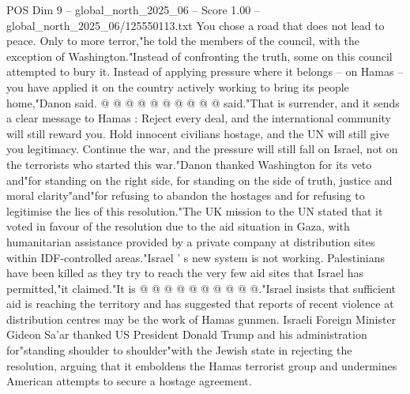\begin{textsample}{POS Dim 9 – global\_north\_2025\_06 – Score 1.00 – global\_north\_2025\_06/125550113.txt}
You chose a road that does not lead to peace.
Only to more terror,"he told the members of the council, with the exception of Washington."Instead of confronting the truth, some on this council attempted to bury it.
Instead of applying pressure where it belongs -- on Hamas -- you have applied it on the country actively working to bring its people home,"Danon said. @ @ @ @ @ @ @ @ @ @ said."That is surrender, and it sends a clear message to Hamas : Reject every deal, and the international community will still reward you.
Hold innocent civilians hostage, and the UN will still give you legitimacy.
Continue the war, and the pressure will still fall on Israel, not on the terrorists who started this war."Danon thanked Washington for its veto and"for standing on the right side, for standing on the side of truth, justice and moral clarity"and"for refusing to abandon the hostages and for refusing to legitimise the lies of this resolution."The UK mission to the UN stated that it voted in favour of the resolution due to the aid situation in Gaza, with humanitarian assistance provided by a private company at distribution sites within IDF-controlled areas."Israel ' s new system is not working.
Palestinians have been killed as they try to reach the very few aid sites that Israel has permitted,"it claimed."It is @ @ @ @ @ @ @ @ @ @."Israel insists that sufficient aid is reaching the territory and has suggested that reports of recent violence at distribution centres may be the work of Hamas gunmen.
Israeli Foreign Minister Gideon Sa'ar thanked US President Donald Trump and his administration for"standing shoulder to shoulder"with the Jewish state in rejecting the resolution, arguing that it emboldens the Hamas terrorist group and undermines American attempts to secure a hostage agreement.

\end{textsample}
